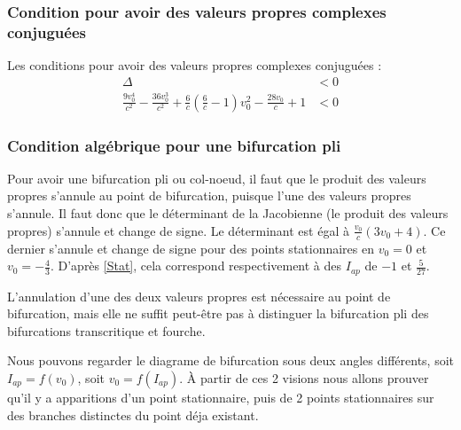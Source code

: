 \documentclass[12pt,a4paper,onecolumn]{article}
\begin{document}

\subsubsection{Condition pour avoir des valeurs propres complexes conjuguées}


Les conditions pour avoir des valeurs propres complexes conjuguées :
\begin{align}
\Delta &< 0 \nonumber\\
\frac{9v_0^4}{c^2} - \frac{36v_0^3}{c^2} + \frac{6}{c}(\frac{6}{c} - 1)v_0^2 - \frac{28v_0}{c} + 1 &<0 \label{DeltaNeg}
\end{align}

\subsubsection{Condition algébrique pour une bifurcation pli}

Pour avoir une bifurcation pli ou col-noeud, il faut que le produit des valeurs propres s'annule au point de bifurcation, puisque l'une des valeurs propres s'annule. Il faut donc que le déterminant de la Jacobienne (le produit des valeurs propres) s'annule et change de signe. Le déterminant est égal à $\frac{v_0}{c} (3v_0 +4)$. Ce dernier s'annule et change de signe pour des points stationnaires en $v_0 = 0$ et $v_0 = -\frac{4}{3}$. D'après \ref{Stat}, cela correspond respectivement à des $I_{ap}$ de $-1$ et $\frac{5}{27}$.

L'annulation d'une des deux valeurs propres est nécessaire au point de bifurcation, mais elle ne suffit peut-être pas à distinguer la bifurcation pli des bifurcations transcritique et fourche.

Nous pouvons regarder le diagrame de bifurcation sous deux angles différents, soit $I_{ap}=f(v_0)$, soit $v_0=f(I_{ap})$. À partir de ces 2 visions nous allons prouver qu'il y a apparitions d'un point stationnaire, puis de 2 points stationnaires sur des branches distinctes du point déja existant.
\end{document}
